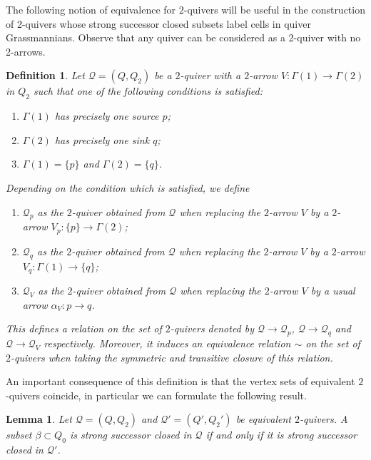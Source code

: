 \documentclass{amsart}
\newtheorem{definition}[theorem]{Definition}
\newtheorem{lemma}[theorem]{Lemma}
\numberwithin{equation}{section}
\newcommand{\cQ}{\mathcal{Q}}
\begin{document}
The following notion of equivalence for $2$-quivers will be useful in the construction of 2-quivers whose strong successor closed subsets label cells in quiver Grassmannians.
Observe that any quiver can be considered as a 2-quiver with no 2-arrows.
\begin{definition}
  \label{def:2equivalence}
  Let $\cQ=(Q,Q_2)$ be a $2$-quiver with a $2$-arrow $V:\Gamma(1)\to\Gamma(2)$ in $Q_2$ such that one of the following conditions is satisfied:
  \begin{enumerate}
    \item $\Gamma(1)$ has precisely one source $p$; 
    \item $\Gamma(2)$ has precisely one sink $q$;
    \item $\Gamma(1)=\{p\}$ and $\Gamma(2)=\{q\}$.
  \end{enumerate}
  Depending on the condition which is satisfied, we define
  \begin{enumerate}
    \item $\cQ_p$ as the $2$-quiver obtained from $\cQ$ when replacing the $2$-arrow $V$ by a $2$-arrow $V_p:\{p\}\to\Gamma(2)$;
    \item $\cQ_q$ as the $2$-quiver obtained from $\cQ$ when replacing the $2$-arrow $V$ by a $2$-arrow $V_q:\Gamma(1)\to \{q\}$;
    \item $\cQ_V$ as the $2$-quiver obtained from $\cQ$ when replacing the $2$-arrow $V$ by a usual arrow $\alpha_V:p\to q$. 
  \end{enumerate}
  This defines a relation on the set of $2$-quivers denoted by $\cQ\to\cQ_p$, $\cQ\to\cQ_q$ and $\cQ\to\cQ_V$ respectively.
  Moreover, it induces an equivalence relation $\sim$ on the set of $2$-quivers when taking the symmetric and transitive closure of this relation. 
\end{definition}

An important consequence of this definition is that the vertex sets of equivalent $2$-quivers coincide, in particular we can formulate the following result.
\begin{lemma}
  \label{lem:2equivalence}
  Let $\cQ=(Q,Q_2)$ and $\cQ'=(Q',Q_2')$ be equivalent $2$-quivers.
  A subset $\beta\subset Q_0$ is strong successor closed in $\cQ$ if and only if it is strong successor closed in $\cQ'$.
\end{lemma}
\end{document}
